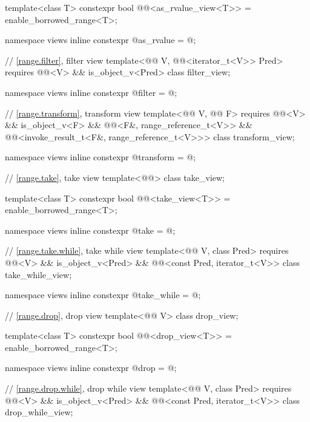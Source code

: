\begin{codeblock}
{  template<class T>
    constexpr bool @@<as_rvalue_view<T>> =
      enable_borrowed_range<T>;

  namespace views { inline constexpr @\unspecnc@ as_rvalue = @\unspecnc@; }

  // \ref{range.filter}, filter view
  template<@@ V, @@<iterator_t<V>> Pred>
    requires @@<V> && is_object_v<Pred>
  class filter_view;

  namespace views { inline constexpr @\unspecnc@ filter = @\unspecnc@; }

  // \ref{range.transform}, transform view
  template<@@ V, @@ F>
    requires @@<V> && is_object_v<F> &&
             @@<F&, range_reference_t<V>> &&
             @@<invoke_result_t<F&, range_reference_t<V>>>
  class transform_view;

  namespace views { inline constexpr @\unspecnc@ transform = @\unspecnc@; }

  // \ref{range.take}, take view
  template<@@> class take_view;

  template<class T>
    constexpr bool @@<take_view<T>> =
      enable_borrowed_range<T>;

  namespace views { inline constexpr @\unspecnc@ take = @\unspecnc@; }

  // \ref{range.take.while}, take while view
  template<@@ V, class Pred>
    requires @@<V> && is_object_v<Pred> &&
             @@<const Pred, iterator_t<V>>
    class take_while_view;

  namespace views { inline constexpr @\unspecnc@ take_while = @\unspecnc@; }

  // \ref{range.drop}, drop view
  template<@@ V>
    class drop_view;

  template<class T>
    constexpr bool @@<drop_view<T>> =
      enable_borrowed_range<T>;

  namespace views { inline constexpr @\unspecnc@ drop = @\unspecnc@; }

  // \ref{range.drop.while}, drop while view
  template<@@ V, class Pred>
    requires @@<V> && is_object_v<Pred> &&
             @@<const Pred, iterator_t<V>>
    class drop_while_view;

}
\end{codeblock}
